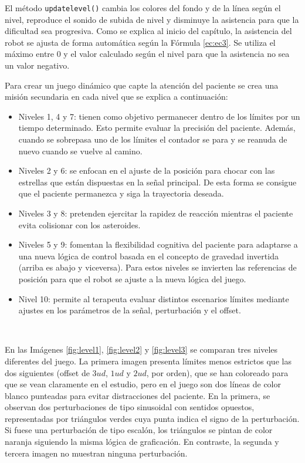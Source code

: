 El método \verb|updatelevel()| cambia los colores del fondo y de la línea según el nivel, reproduce el sonido de subida de nivel y disminuye la asistencia para que la dificultad sea progresiva.
Como se explica al inicio del capítulo, la asistencia del robot se ajusta de forma automática según la Fórmula \ref{ec:ec3}.
Se utiliza el máximo entre 0 y el valor calculado según el nivel para que la asistencia no sea un valor negativo.

Para crear un juego dinámico que capte la atención del paciente se crea una misión secundaria en cada nivel que se explica a continuación:
\begin{itemize}
    \item Niveles 1, 4 y 7: tienen como objetivo permanecer dentro de los límites por un tiempo determinado. Esto permite evaluar la precisión del paciente. Además, cuando se sobrepasa uno de los límites el contador se para y se reanuda de nuevo cuando se vuelve al camino.
	\item Niveles 2 y 6: se enfocan en el ajuste de la posición para chocar con las estrellas que están dispuestas en la señal principal. De esta forma se consigue que el paciente permanezca y siga la trayectoria deseada.
	\item Niveles 3 y 8: pretenden ejercitar la rapidez de reacción mientras el paciente evita colisionar con los asteroides.
	\item Niveles 5 y 9: fomentan la flexibilidad cognitiva del paciente para adaptarse a una nueva lógica de control basada en el concepto de gravedad invertida (arriba es abajo y viceversa). Para estos niveles se invierten las referencias de posición para que el robot se ajuste a la nueva lógica del juego.
	\item Nivel 10: permite al terapeuta evaluar distintos escenarios límites mediante ajustes en los parámetros de la señal, perturbación y el offset.
\end{itemize}\

En las Imágenes \ref{fig:level1}, \ref{fig:level2} y \ref{fig:level3} se comparan tres niveles diferentes del juego.
La primera imagen presenta límites menos estrictos que las dos siguientes (offset de $3 ud$, $1 ud$ y $2 ud$, por orden), que se han coloreado para que se vean claramente en el estudio, pero en el juego son dos líneas de color blanco punteadas para evitar distracciones del paciente.
En la primera, se observan dos perturbaciones de tipo sinusoidal con sentidos opuestos, representadas por triángulos verdes cuya punta indica el signo de la perturbación.
Si fuese una perturbación de tipo escalón, los triángulos se pintan de color naranja siguiendo la misma lógica de graficación.
En contraste, la segunda y tercera imagen no muestran ninguna perturbación.

